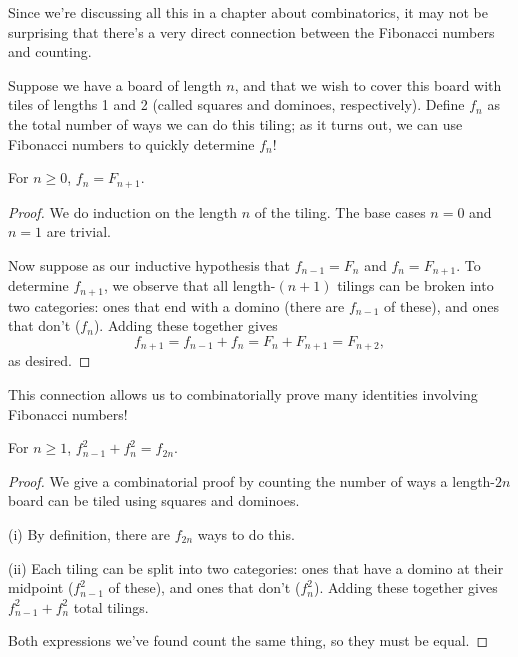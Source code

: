 \documentclass[../m055main.tex]{subfiles}
\begin{document}
Since we're discussing all this in a chapter about combinatorics, it may not be surprising that there's a very direct connection between the Fibonacci numbers and counting.

Suppose we have a board of length $n$, and that we wish to cover this board with tiles of lengths 1 and 2 (called squares and dominoes, respectively).
Define $f_n$ as the total number of ways we can do this tiling; as it turns out, we can use Fibonacci numbers to quickly determine $f_n$!

\begin{theorem}
    For $n \geq 0$, $f_n = F_{n+1}$.
\end{theorem}

\begin{proof}
    We do induction on the length $n$ of the tiling.
    The base cases $n=0$ and $n=1$ are trivial.

    Now suppose as our inductive hypothesis that $f_{n-1} = F_n$ and $f_n = F_{n+1}$.
    To determine $f_{n+1}$, we observe that all length-$(n+1)$ tilings can be broken into two categories: ones that end with a domino (there are $f_{n-1}$ of these), and ones that don't ($f_n$).
    Adding these together gives
    \[ f_{n+1} = f_{n-1} + f_n = F_n + F_{n+1} = F_{n+2}, \]
    as desired.
\end{proof}

This connection allows us to combinatorially prove many identities involving Fibonacci numbers!

\begin{theorem}
    For $n \geq 1$, $f_{n-1}^2 + f_n^2 = f_{2n}$.
\end{theorem}

\begin{proof}
    We give a combinatorial proof by counting the number of ways a length-$2n$ board can be tiled using squares and dominoes.
    \smallskip

    (i) By definition, there are $f_{2n}$ ways to do this.
    \smallskip

    (ii) Each tiling can be split into two categories: ones that have a domino at their midpoint ($f_{n-1}^2$ of these), and ones that don't ($f_n^2$).
    Adding these together gives $f_{n-1}^2 + f_n^2$ total tilings.

    \smallskip

    Both expressions we've found count the same thing, so they must be equal.
\end{proof}
\end{document}
